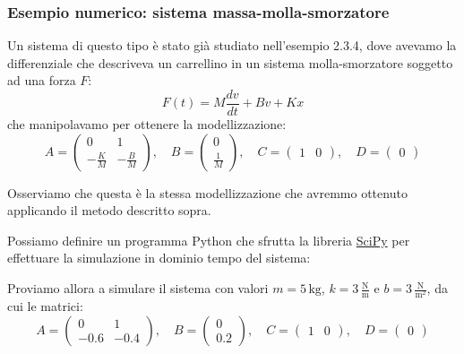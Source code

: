 \documentclass[a4paper,11pt]{article}
\begin{document}
\subsubsection{Esempio numerico: sistema massa-molla-smorzatore}
Un sistema di questo tipo è stato già studiato nell'esempio 2.3.4, dove avevamo la differenziale che descriveva un carrellino in un sistema molla-smorzatore soggetto ad una forza $F$:
$$
F(t) = M \frac{dv}{dt} + Bv + Kx
$$
che manipolavamo per ottenere la modellizzazione:
$$
A = \begin{pmatrix}
	0 & 1 \\ 
	-\frac{K}{M} & -\frac{B}{M}
\end{pmatrix}, \quad 
B = \begin{pmatrix}
	0 \\ \frac{1}{M}
\end{pmatrix}, \quad
C = \begin{pmatrix}
	1 & 0
\end{pmatrix}, \quad 
D = \begin{pmatrix}
0
\end{pmatrix}
$$

Osserviamo che questa è la stessa modellizzazione che avremmo ottenuto applicando il metodo descritto sopra.

Possiamo definire un programma Python che sfrutta la libreria \href{http://scipy.org}{SciPy} per effettuare la simulazione in dominio tempo del sistema:
\lstset{style=codestyle, language=python}


Proviamo allora a simulare il sistema con valori $m = 5 \, \mathrm{kg}$, $k = 3 \, \frac{\mathrm{N}}{\mathrm{m}}$ e $b = 3 \, \frac{\mathrm{N}}{\mathrm{m}^2}$, da cui le matrici:
$$
A = \begin{pmatrix}
	0 & 1 \\ 
	-0.6 & -0.4
\end{pmatrix}, \quad 
B = \begin{pmatrix}
	0 \\ 0.2
\end{pmatrix}, \quad
C = \begin{pmatrix}
	1 & 0
\end{pmatrix}, \quad 
D = \begin{pmatrix}
0
\end{pmatrix}
$$
\end{document}
